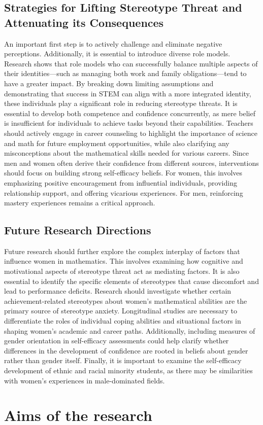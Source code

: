 \subsection{Strategies for Lifting Stereotype Threat and Attenuating its Consequences}
An important first step is to actively challenge and eliminate negative perceptions. Additionally, it is essential to introduce diverse role models. Research shows that role models who can successfully balance multiple aspects of their identities—such as managing both work and family obligations—tend to have a greater impact. By breaking down limiting assumptions and demonstrating that success in STEM can align with a more integrated identity, these individuals play a significant role in reducing stereotype threats.
It is essential to develop both competence and confidence concurrently, as mere belief is insufficient for individuals to achieve tasks beyond their capabilities.
Teachers should actively engage in career counseling to highlight the importance of science and math for future employment opportunities, while also clarifying any misconceptions about the mathematical skills needed for various careers. Since men and women often derive their confidence from different sources, interventions should focus on building strong self-efficacy beliefs. For women, this involves emphasizing positive encouragement from influential individuals, providing relationship support, and offering vicarious experiences. For men, reinforcing mastery experiences remains a critical approach. 
\subsection{Future Research Directions}
Future research should further explore the complex interplay of factors that influence women in mathematics. This involves examining how cognitive and motivational aspects of stereotype threat act as mediating factors. It is also essential to identify the specific elements of stereotypes that cause discomfort and lead to performance deficits. Research should investigate whether certain achievement-related stereotypes about women's mathematical abilities are the primary source of stereotype anxiety. Longitudinal studies are necessary to differentiate the roles of individual coping abilities and situational factors in shaping women's academic and career paths. Additionally, including measures of gender orientation in self-efficacy assessments could help clarify whether differences in the development of confidence are rooted in beliefs about gender rather than gender itself. Finally, it is important to examine the self-efficacy development of ethnic and racial minority students, as there may be similarities with women's experiences in male-dominated fields.

\section{Aims of the research}